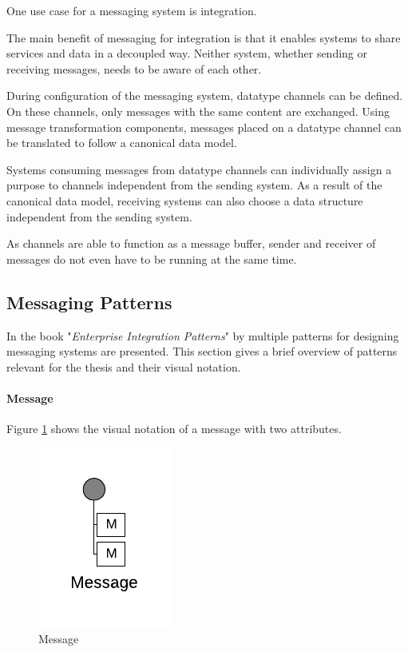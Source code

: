 One use case for a messaging system is integration.

The main benefit of messaging for integration is that it enables systems to share services and data in a decoupled way. Neither system, whether sending or receiving messages, needs to be aware of each other. 

During configuration of the messaging system, datatype channels can be defined. On these channels, only messages with the same content are exchanged. Using message transformation components, messages placed on a datatype channel can be translated to follow a canonical data model.

Systems consuming messages from datatype channels can individually assign a purpose to channels independent from the sending system. As a result of the canonical data model, receiving systems can also choose a data structure independent from the sending system.

As channels are able to function as a message buffer, sender and receiver of messages do not even have to be running at the same time.

\subsection{Messaging Patterns}

In the book "\textit{Enterprise Integration Patterns}" by \cite{EIP} multiple patterns for designing messaging systems are presented. This section gives a brief overview of patterns relevant for the thesis and their visual notation.

\paragraph{Message}

Figure \ref{messaging:message} shows the visual notation of a message with two attributes. 

\begin{figure}[H]
    \centering
    \includegraphics[scale=0.6]{Diagrams/Messaging/1. Message.pdf}
    \caption{Message}
    \label{messaging:message}
\end{figure}

